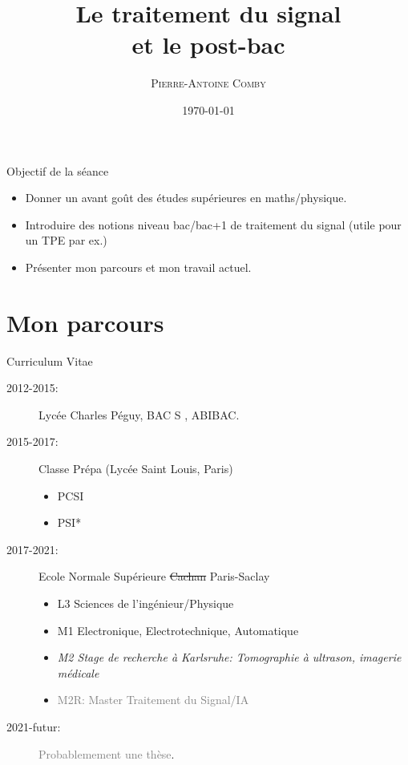 \documentclass[handout]{beamer}
\title{Le traitement du signal \\et le post-bac}
\subtitle{}
\author[]{\textsc{Pierre-Antoine Comby}}
\institute{pierre-antoine.comby@ens-paris-saclay.fr}
\date{\today}
\begin{document}
\begin{frame}
   \titlepage
\end{frame}

\begin{frame}{Objectif de la séance}
  \begin{itemize}
    \item Donner un avant goût des études supérieures en maths/physique.
    \item Introduire des notions niveau bac/bac+1 de traitement du signal (utile pour un TPE par ex.)
    \item Présenter mon parcours et mon travail actuel.
  \end{itemize}
\end{frame}

\section{Mon parcours}
\label{sec:label}
\begin{frame}{Curriculum Vitae}
  \begin{description}
    \item[2012-2015:] Lycée Charles Péguy, BAC S , ABIBAC.
    \item[2015-2017:] Classe Prépa (Lycée Saint Louis, Paris)
      \begin{itemize}
        \item PCSI
        \item PSI*
      \end{itemize}
    \item[2017-2021:] Ecole Normale Supérieure \sout{Cachan} Paris-Saclay
      \begin{itemize}
        \item L3 Sciences de l'ingénieur/Physique
        \item M1 Electronique, Electrotechnique, Automatique
        \item \textit{M2 Stage de recherche à Karlsruhe: Tomographie à ultrason, imagerie médicale}
        \item \textcolor{gray}{M2R: Master Traitement du Signal/IA}
      \end{itemize}
    \item[2021-futur:] \textcolor{gray}{Probablemement une thèse}.
  \end{description}
\end{frame}
\end{document}
